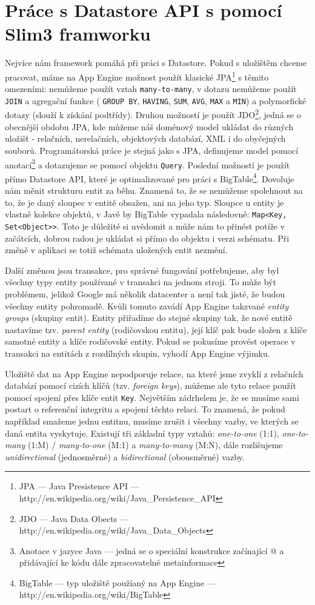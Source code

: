 \section{Práce s Datastore API s pomocí Slim3 framworku}
Nejvíce nám framework pomáhá při práci s Datastore. Pokud s uložištěm chceme pracovat, máme na App Engine možnost použít klasické JPA\footnote{JPA --- Java Presistence API --- http://en.wikipedia.org/wiki/Java\_Persistence\_API} s těmito omezeními: nemůžeme použít vztah \verb|many-to-many|, v dotazu nemůžeme použít \verb|JOIN| a agregační funkce ( \verb|GROUP BY|,  \verb|HAVING|,  \verb|SUM|,  \verb|AVG|,  \verb|MAX| a  \verb|MIN|) a polymorfické dotazy (slouží k získání podtřídy). Druhou možností je použít JDO\footnote{JDO --- Java Data Obects --- http://en.wikipedia.org/wiki/Java\_Data\_Objects}, jedná se o obecnější obdobu JPA, kde můžeme náš doménový model ukládat do různých uložišť - relačních, nerelačních, objektových databází,  XML i do obyčejných souborů. Programátorská práce je stejná jako s JPA, definujeme model pomocí anotací\footnote{Anotace v jazyce Java --- jedná se o speciální konstrukce začínající @ a přidávající ke kódu dále zpracovatelné metainformace} a dotazujeme se pomocí objektu \verb|Query|. Poslední možností je použít přímo Datastore API, které je optimalizované pro práci s BigTable\footnote{BigTable --- typ uložiště použíaný na App Engine --- http://en.wikipedia.org/wiki/BigTable}. Dovoluje nám měnit strukturu entit za běhu. Znamená to, že se nemůžeme spolehnout na to, že je daný sloupec v entitě obsažen, ani na jeho typ. Sloupce u entity je vlastně kolekce objektů, v Javě by BigTable vypadala následovně: \verb|Map<Key, Set<Object>>|. Toto je důležité si uvědomit a může nám to přinést potíže v začátcích, dobrou radou je ukládat si přímo do objektu i verzi schématu. Při změně v aplikaci se totiž schémata uložených entit nezmění. 

Další změnou jsou transakce, pro správné fungování potřebujeme, aby byl všechny typy entity používané v transakci na jednom stroji. To může být problémem, jelikož Google má několik datacenter a není tak jisté, že budou všechny entity pohromadě. Kvůli tomuto zavádí App Engine takzvané \emph{entity groups} (skupiny entit). Entity přiřadíme do stejné skupiny tak, že nové entitě nastavíme tzv. \emph{parent entity} (rodičovskou entitu), její klíč pak bude složen z klíče samotné entity a klíče rodičovské entity. Pokud se pokusíme provést operace v transakci na entitách z rozdílných skupin, vyhodí App Engine výjimku.

Uložiště dat na App Engine nepodporuje relace, na které jsme zvyklí z relačních databází pomocí cizích klíčů (tzv. \emph{foreign keys}), můžeme ale tyto relace použít pomocí spojení přes klíče entit \verb|Key|. Největším zádrhelem je, že se musíme sami postart o referenční integritu a spojení těchto relací. To znamená, že pokud například smažeme jednu entitnu, musíme zrušit i všechny vazby, ve kterých se daná entita vyskytuje. Existují tři základní typy vztahů: \emph{one-to-one} (1:1), \emph{one-to-many} (1:M) / \emph{many-to-one} (M:1) a \emph{many-to-many} (M:N), dále rozlišujeme \emph{unidirectional} (jednosměrné) a \emph{bidirectional} (obousměrné) vazby. 

